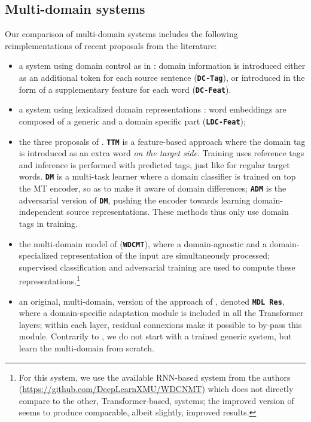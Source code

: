 \documentclass[11pt,a4paper]{article}
\newcommand{\fyDone}[1]{\done[FY]\Todo[FY:]{\textcolor{orange}{#1}}}
\newcommand{\jcTodo}[1]{\Todo[JC:]{\textcolor{red}{#1}}}
\newcommand{\system}[1]{\texttt{\textbf{#1}}}
\begin{document}
\subsection{Multi-domain systems \label{ssec:systems}}
\fyDone{Remove Gated residual}
Our comparison of multi-domain systems includes the following reimplementations of recent proposals from the literature:
\begin{itemize}
\item a system using domain control as in \cite{Kobus17domaincontrol}: domain information is introduced either as an additional token for each source sentence (\system{DC-Tag}), or introduced in the form of a supplementary feature for each word (\system{DC-Feat}).
\item a system using lexicalized domain representations \cite{Pham19generic}: word embeddings are composed of a generic and a domain specific part (\system{LDC-Feat});\jcTodo{why not LDR as in Minh's paper?}
\item the three proposals of . \system{TTM} is a feature-based approach where the domain tag is introduced as an extra word \textsl{on the target side}. Training uses reference tags and inference is performed with predicted tags, just like for regular target words. \system{DM} is a multi-task learner where a domain classifier is trained on top the MT encoder, so as to make it aware of domain differences; \system{ADM} is the adversarial version of \system{DM}, pushing the encoder towards learning domain-independent source representations. These methods thus only use domain tags in training.
\item the multi-domain model of  (\system{WDCMT}), where a domain-agnostic and a domain-specialized representation of the input are simultaneously processed; supervised classification and adversarial training are used to compute these representations.\footnote{For this system, we use the available RNN-based system from the authors (\url{https://github.com/DeepLearnXMU/WDCNMT}\fyDone{URLs}) which does not directly compare to the other, Transformer-based, systems; the improved version of \cite{Su19exploring} seems to produce comparable, albeit slightly, improved results.}\fyDone{Check this}
\item an original, multi-domain, version of the approach of , denoted \system{MDL Res}, where a domain-specific adaptation module is included in all the Transformer layers; within each layer, residual connexions make it possible to by-pass this module.
Contrarily to \cite{Bapna19simple}, we do not start with a trained generic system, but learn the multi-domain from scratch.\fyDone{Check this.}
\end{itemize}
\end{document}
